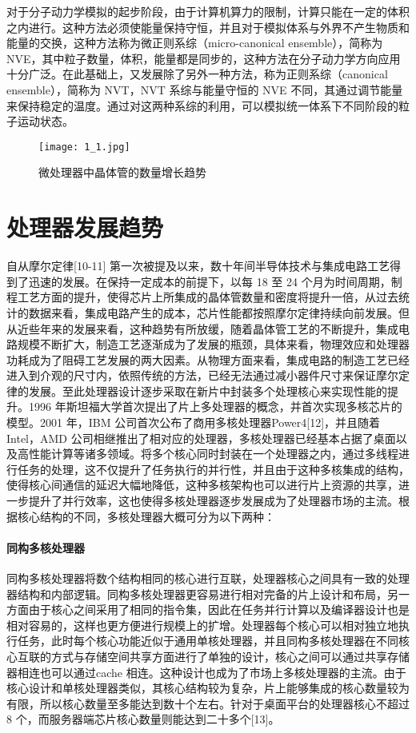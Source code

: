 对于分子动力学模拟的起步阶段，由于计算机算力的限制，计算只能在一定的体积之内进行。这种方法必须使能量保持守恒，并且对于模拟体系与外界不产生物质和能量的交换，这种方法称为微正则系综（micro-canonical ensemble），简称为NVE，其中粒子数量，体积，能量都是同步的，这种方法在分子动力学方向应用十分广泛。在此基础上，又发展除了另外一种方法，称为正则系综（canonical ensemble），简称为 NVT，NVT 系综与能量守恒的 NVE 不同，其通过调节能量来保持稳定的温度。通过对这两种系综的利用，可以模拟统一体系下不同阶段的粒子运动状态。

 \begin{figure}[h]
  \centering
  \texttt{[image: 1\_1.jpg]}
  \caption{微处理器中晶体管的数量增长趋势}
  \label{fig:badge}
\end{figure}

\section{处理器发展趋势}
自从摩尔定律[10-11] 第一次被提及以来，数十年间半导体技术与集成电路工艺得到了迅速的发展。在保持一定成本的前提下，以每 18 至 24 个月为时间周期，制程工艺方面的提升，使得芯片上所集成的晶体管数量和密度将提升一倍，从过去统计的数据来看，集成电路产生的成本，芯片性能都按照摩尔定律持续向前发展。但从近些年来的发展来看，这种趋势有所放缓，随着晶体管工艺的不断提升，集成电路规模不断扩大，制造工艺逐渐成为了发展的瓶颈，具体来看，物理效应和处理器功耗成为了阻碍工艺发展的两大因素。从物理方面来看，集成电路的制造工艺已经进入到介观的尺寸内，依照传统的方法，已经无法通过减小器件尺寸来保证摩尔定律的发展。至此处理器设计逐步采取在新片中封装多个处理核心来实现性能的提升。1996 年斯坦福大学首次提出了片上多处理器的概念，并首次实现多核芯片的模型。2001 年，IBM 公司首次公布了商用多核处理器Power4[12]，并且随着Intel，AMD 公司相继推出了相对应的处理器，多核处理器已经基本占据了桌面以及高性能计算等诸多领域。将多个核心同时封装在一个处理器之内，通过多线程进行任务的处理，这不仅提升了任务执行的并行性，并且由于这种多核集成的结构，使得核心间通信的延迟大幅地降低，这种多核架构也可以进行片上资源的共享，进一步提升了并行效率，这也使得多核处理器逐步发展成为了处理器市场的主流。根据核心结构的不同，多核处理器大概可分为以下两种：

\paragraph{同构多核处理器}
同构多核处理器将数个结构相同的核心进行互联，处理器核心之间具有一致的处理器结构和内部逻辑。同构多核处理器更容易进行相对完备的片上设计和布局，另一方面由于核心之间采用了相同的指令集，因此在任务并行计算以及编译器设计也是相对容易的，这样也更方便进行规模上的扩增。处理器每个核心可以相对独立地执行任务，此时每个核心功能近似于通用单核处理器，并且同构多核处理器在不同核心互联的方式与存储空间共享方面进行了单独的设计，核心之间可以通过共享存储器相连也可以通过cache 相连。这种设计也成为了市场上多核处理器的主流。由于核心设计和单核处理器类似，其核心结构较为复杂，片上能够集成的核心数量较为有限，所以核心数量至多能达到数十个左右。针对于桌面平台的处理器核心不超过 8 个，而服务器端芯片核心数量则能达到二十多个[13]。
